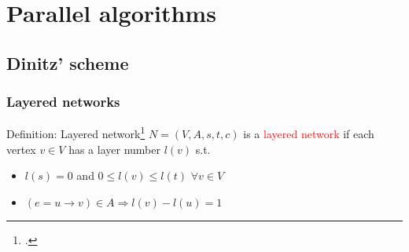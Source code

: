 \documentclass{beamer}
\begin{document}
\section{Parallel algorithms}
\subsection{Dinitz' scheme}

\begin{frame}
\frametitle{Layered networks}
	\begin{block}{Definition: Layered network\footcite{yossi81}}
	$N = (V,A,s,t,c)$ is a \textcolor{red}{layered network} if each vertex $v \in V$ has a layer number $l(v)$ s.t.
	\begin{itemize}
		\item $l(s) = 0$ and $0 \leq l(v) \leq l(t)$ $\forall v \in V$
		\item $(e = u \rightarrow v) \in A  \Rightarrow l(v) - l(u) = 1$
	\end{itemize}
	\end{block}
\end{frame}
\end{document}
